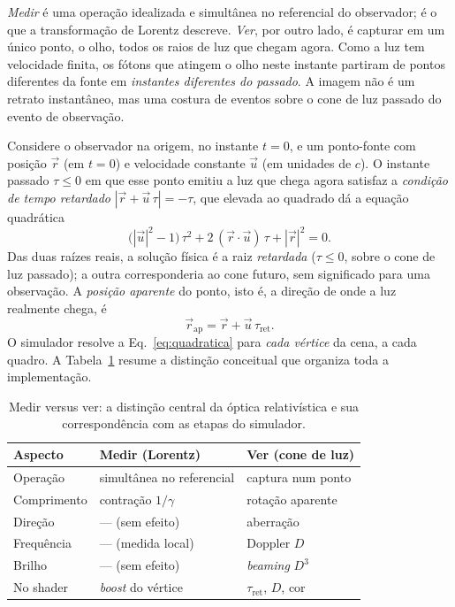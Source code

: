 \documentclass[10pt,a4paper,twocolumn]{article}
\begin{document}
\emph{Medir} é uma operação idealizada e simultânea no referencial do observador; é o que a
transformação de Lorentz descreve. \emph{Ver}, por outro lado, é capturar em um único
ponto, o olho, todos os raios de luz que chegam agora. Como a luz tem velocidade
finita, os fótons que atingem o olho neste instante partiram de pontos diferentes da fonte
em \emph{instantes diferentes do passado}. A imagem não é um retrato instantâneo, mas uma
costura de eventos sobre o cone de luz passado do evento de observação.

Considere o observador na origem, no instante $t = 0$, e um ponto-fonte com posição
$\vec{r}$ (em $t=0$) e velocidade constante $\vec{u}$ (em unidades de $c$). O instante
passado $\tau \leq 0$ em que esse ponto emitiu a luz que chega agora satisfaz a
\emph{condição de tempo retardado} $|\vec{r} + \vec{u}\,\tau| = -\tau$, que elevada ao
quadrado dá a equação quadrática
\begin{equation}
  \bigl(|\vec{u}|^{2}-1\bigr)\,\tau^{2}
  + 2\,(\vec{r}\cdot\vec{u})\,\tau
  + |\vec{r}|^{2} = 0 .
  \label{eq:quadratica}
\end{equation}
Das duas raízes reais, a solução física é a raiz \emph{retardada} ($\tau \leq 0$, sobre o
cone de luz passado); a outra corresponderia ao cone futuro, sem significado para uma
observação. A \emph{posição aparente} do ponto, isto é, a direção de onde a luz realmente
chega, é
\begin{equation}
  \vec{r}_{\mathrm{ap}} = \vec{r} + \vec{u}\,\tau_{\mathrm{ret}} .
  \label{eq:aparente}
\end{equation}
O simulador resolve a Eq.~\eqref{eq:quadratica} para \emph{cada vértice} da cena, a cada
quadro. A Tabela~\ref{tab:medirver} resume a distinção conceitual que organiza toda a
implementação.

\begin{table}[t]
  \centering
  \caption{Medir versus ver: a distinção central da óptica relativística e sua
           correspondência com as etapas do simulador.}
  \label{tab:medirver}
  \footnotesize
  \setlength{\tabcolsep}{4pt}
  \begin{tabular}{@{}lll@{}}
    \toprule
    Aspecto & Medir (Lorentz) & Ver (cone de luz) \\
    \midrule
    Operação    & simultânea no referencial & captura num ponto \\
    Comprimento & contração $1/\gamma$      & rotação aparente \\
    Direção     & --- (sem efeito)          & aberração \\
    Frequência  & --- (medida local)        & Doppler $D$ \\
    Brilho      & --- (sem efeito)          & \emph{beaming} $D^{3}$ \\
    No shader   & \emph{boost} do vértice   & $\tau_{\mathrm{ret}}$, $D$, cor \\
    \bottomrule
  \end{tabular}
\end{table}
\end{document}
